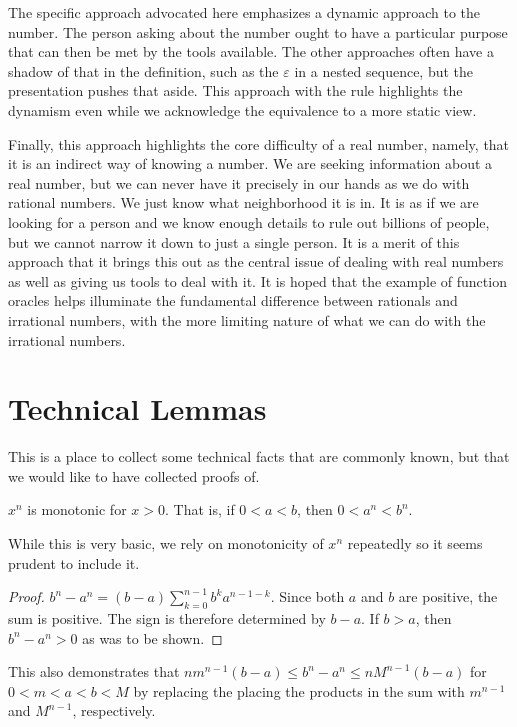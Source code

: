 \documentclass[12pt]{article}
\begin{document}
The specific approach advocated here emphasizes a dynamic approach to the number. The person asking about the number ought to have a particular purpose that can then be met by the tools available. The other approaches often have a shadow of that in the definition, such as the $\varepsilon$ in a nested sequence, but the presentation pushes that aside. This approach with the rule highlights the dynamism even while we acknowledge the equivalence to a more static view. 

Finally, this approach highlights the core difficulty of a real number, namely, that it is an indirect way of knowing a number. We are seeking information about a real number, but we can never have it precisely in our hands as we do with rational numbers. We just know what neighborhood it is in. It is as if we are looking for a person and we know enough details to rule out billions of people, but we cannot narrow it down to just a single person. It is a merit of this approach that it brings this out as the central issue of dealing with real numbers as well as giving us tools to deal with it. It is hoped that the example of function oracles helps illuminate the fundamental difference between rationals and irrational numbers, with the more limiting nature of what we can do with the irrational numbers. 

\appendix

\section{Technical Lemmas}\label{app:A}

This is a place to collect some technical facts that are commonly known, but that we would like to have collected proofs of. 

\begin{lemma}
$x^n$ is monotonic for $x>0$. That is, if $0 < a < b$, then $0 < a^n<b^n$.
\end{lemma}

While this is very basic, we rely on monotonicity of $x^n$ repeatedly so it seems prudent to include it. 

\begin{proof}
$b^n-a^n= (b-a)\sum_{k=0}^{n-1} b^k a^{n-1-k}$. Since both $a$ and $b$ are positive, the sum is positive. The sign is therefore determined by $b-a$. If $b>a$, then $b^n-a^n > 0$ as was to be shown. 
\end{proof}

This also demonstrates that $ n m^{n-1} (b-a) \leq  b^n -a^n \leq n M^{n-1} (b-a)$ for $0 < m < a< b< M$ by replacing the placing the products in the sum with $m^{n-1}$ and $M^{n-1}$, respectively. 
\end{document}
